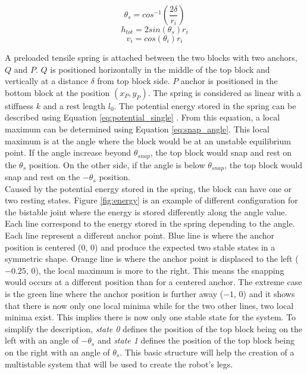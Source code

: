     \begin{equation}
        \theta_s = cos^{-1}\left(\frac{2\delta}{r_i}\right)
        \label{eq:theta_s}
    \end{equation}
    \begin{equation}
        h_{tot} = 2 sin(\theta_s) r_i
        \label{eq:max_dist}
    \end{equation}
    \begin{equation}
        v_i = cos(\theta_i) r_i
        \label{eq:y_block}
    \end{equation}
    
    A preloaded tensile spring is attached between the two blocks with two anchors, $Q$ and $P$. $Q$ is positioned horizontally in the middle of the top block and vertically at a distance $\delta$ from top block side. $P$ anchor is positioned in the bottom block at the position $(x_P, y_P)$.
    The spring is considered as linear with a stiffness $k$ and a rest length $l_0$. The potential energy stored in the spring can be described using Equation \ref{eq:potential_single} \cite{mo_main_paper}. From this equation, a local maximum can be determined using Equation \ref{eq:snap_angle}. This local maximum is at the angle where the block would be at an unstable equilibrium point. If the angle increase beyond $\theta_{snap}$, the top block would snap and rest on the $\theta_s$ position. On the other side, if the angle is below $\theta_{snap}$, the top block would snap and rest on the $-\theta_s$ position.\\
    
   Caused by the potential energy stored in the spring, the block can have one or two resting states. Figure \ref{fig:energy} is an example of different configuration for the bistable joint where the energy is stored differently along the angle value. Each line correspond to the energy stored in the spring depending to the angle. Each line represent a different anchor point. Blue line is where the anchor position is centered ($0$, $0$) and produce the expected two stable states in a symmetric shape. Orange line is where the anchor point is displaced to the left ($-0.25$, $0$), the local maximum is more to the right. This means the snapping would occurs at a different position than for a centered anchor. The extreme case is the green line where the anchor position is further away ($-1$, $0$) and it shows that there is now only one local minima while for the two other lines, two local minima exist. This implies there is now only one stable state for the system. To simplify the description, \textit{state 0} defines the position of the top block being on the left with an angle of $-\theta_s$ and \textit{state 1}  defines the position of the top block being on the right with an angle of $\theta_s$. This basic structure will help the creation of a multistable system that will be used to create the robot's legs. 
    

